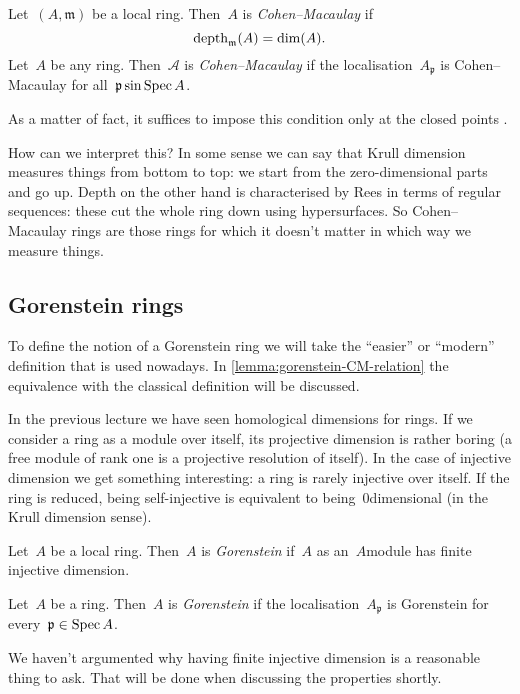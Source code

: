 \documentclass[10pt,a4paper]{article}
\begin{document}
\begin{definition}
  Let~$(A,\mathfrak{m})$ be a local ring. Then~$A$ is \emph{Cohen--Macaulay} if
  \begin{equation}
    \operatorname{depth}_{\mathfrak{m}}(A)=\dim(A).
  \end{equation}
  Let~$A$ be any ring. Then~$\mathcal{A}$ is \emph{Cohen--Macaulay} if the localisation~$A_{\mathfrak{p}}$ is Cohen--Macaulay for all~$\mathfrak{p}\sin\operatorname{Spec} A$.
\end{definition}
As a matter of fact, it suffices to impose this condition only at the closed points \cite[proposition 18.8]{eisenbud-commutative-algebra}.

How can we interpret this? In some sense we can say that Krull dimension measures things from bottom to top: we start from the zero-dimensional parts and go up. Depth on the other hand is characterised by Rees in terms of regular sequences: these cut the whole ring down using hypersurfaces. So Cohen--Macaulay rings are those rings for which it doesn't matter in which way we measure things.

\subsection{Gorenstein rings}
To define the notion of a Gorenstein ring we will take the ``easier'' or ``modern'' definition that is used nowadays. In \cref{lemma:gorenstein-CM-relation} the equivalence with the classical definition will be discussed.

In the previous lecture we have seen homological dimensions for rings. If we consider a ring as a module over itself, its projective dimension is rather boring (a free module of rank one is a projective resolution of itself). In the case of injective dimension we get something interesting: a ring is rarely injective over itself. If the ring is reduced, being self-injective is equivalent to being~$0$\dash dimensional (in the Krull dimension sense).

\begin{definition}
  Let~$A$ be a local ring. Then~$A$ is \emph{Gorenstein} if~$A$ as an~$A$\dash module has finite injective dimension.
  
  Let~$A$ be a ring. Then~$A$ is \emph{Gorenstein} if the localisation~$A_{\mathfrak{p}}$ is Gorenstein for every~$\mathfrak{p}\in\operatorname{Spec} A$.
\end{definition}

We haven't argumented why having finite injective dimension is a reasonable thing to ask. That will be done when discussing the properties shortly.
\end{document}
